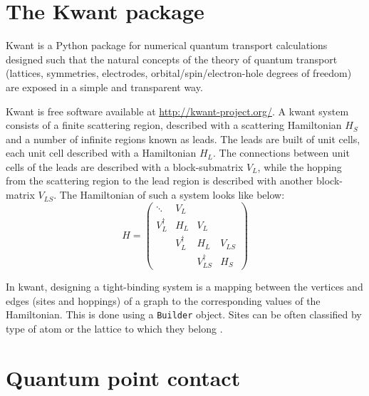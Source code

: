 \documentclass[11pt, a4paper, twocolumn]{article}
\begin{document}
\section*{The Kwant package}
Kwant is a Python package for numerical quantum transport calculations \cite{kwant-paper} 
designed such that the natural concepts of the theory of quantum transport (lattices, symmetries,
electrodes, orbital/spin/electron-hole degrees of freedom) are exposed in a simple and transparent way.

Kwant is free software available at \url{http://kwant-project.org/}. A kwant system consists of a finite scattering region,
described with a scattering Hamiltonian $H_S$ and a number of infinite regions known as leads.
The leads are built of unit cells, each unit cell described with a Hamiltonian $H_L$. The connections
between unit cells of the leads are described with a block-submatrix $V_L$, while the hopping from the scattering region
to the lead region is described with another block-matrix $V_{LS}$. The Hamiltonian of such a system looks like below:
\begin{equation*}
  H = \left(
    \begin{array}{cccc}
      \ddots     & V_L        &                  &        \\
      V_L^{\dag} & H_L        & V_L              &        \\
                 & V_L^{\dag} & H_L              &  V_{LS}\\
                 &            & V_{LS}^{\dag}    & H_S
    \end{array}
  \right)
\end{equation*}

\par In kwant, designing a tight-binding system is a mapping between the vertices and edges (sites and hoppings) of
a graph to the corresponding values of the Hamiltonian. This is done using a \texttt{Builder} object. Sites can
be often classified by type of atom or the lattice to which they belong \cite{kwant-paper}.

\section*{Quantum point contact}
\end{document}
